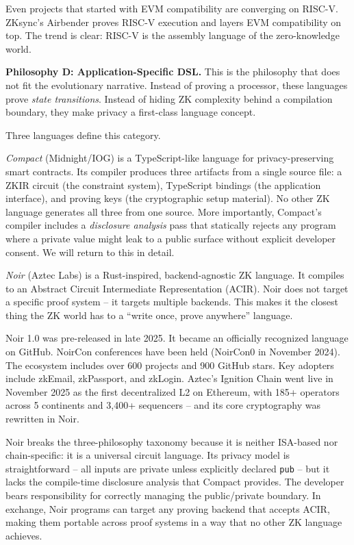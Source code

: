 \documentclass[
  11pt,
  openany]{report}
\renewcommand{\textbf}[1]{{\bfseries\color{MidnightBold}#1}}
\begin{document}
Even projects that started with EVM compatibility are converging on RISC-V.
ZKsync's Airbender proves RISC-V execution and layers EVM compatibility on top.
The trend is clear: RISC-V is the assembly language of the zero-knowledge world.

\textbf{Philosophy D: Application-Specific DSL.} This is the philosophy that
does not fit the evolutionary narrative. Instead of proving a processor, these
languages prove \emph{state transitions}. Instead of hiding ZK complexity behind
a compilation boundary, they make privacy a first-class language concept.

Three languages define this category.

\emph{Compact} (Midnight/IOG) is a TypeScript-like language for
privacy-preserving smart contracts. Its compiler produces three artifacts from a
single source file: a ZKIR circuit (the constraint system), TypeScript bindings
(the application interface), and proving keys (the cryptographic setup
material). No other ZK language generates all three from one source. More
importantly, Compact's compiler includes a \emph{disclosure analysis} pass that
statically rejects any program where a private value might leak to a public
surface without explicit developer consent. We will return to this in detail.

\emph{Noir} (Aztec Labs) is a Rust-inspired, backend-agnostic ZK language. It
compiles to an Abstract Circuit Intermediate Representation (ACIR). Noir does
not target a specific proof system -- it targets multiple backends. This makes
it the closest thing the ZK world has to a ``write once, prove anywhere''
language.

Noir 1.0 was pre-released in late 2025. It became an officially recognized
language on GitHub. NoirCon conferences have been held (NoirCon0 in November
2024). The ecosystem includes over 600 projects and 900 GitHub stars. Key
adopters include zkEmail, zkPassport, and zkLogin. Aztec's Ignition Chain went
live in November 2025 as the first decentralized L2 on Ethereum, with 185+
operators across 5 continents and 3,400+ sequencers -- and its core cryptography
was rewritten in Noir.

Noir breaks the three-philosophy taxonomy because it is neither ISA-based nor
chain-specific: it is a universal circuit language. Its privacy model is
straightforward -- all inputs are private unless explicitly declared
\texttt{pub} -- but it lacks the compile-time disclosure analysis that Compact
provides. The developer bears responsibility for correctly managing the
public/private boundary. In exchange, Noir programs can target any proving
backend that accepts ACIR, making them portable across proof systems in a way
that no other ZK language achieves.
\end{document}
